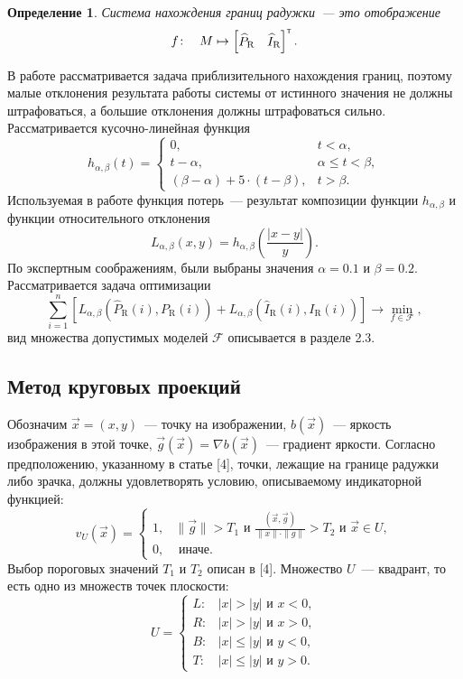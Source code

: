 \documentclass[12pt, twoside]{article}
\newtheorem{definition}{Определение}
\begin{document}
\begin{definition}
\emph{Система нахождения границ радужки}~--- это отображение
\[f\!: \quad M \mapsto \begin{bmatrix}\widehat{P}_\text{R} &  \widehat{I}_\text{R}\end{bmatrix}^{\text{\tiny\sffamily\upshape\mdseries T}}.\]
\end{definition}
В работе рассматривается задача приблизительного нахождения границ, поэтому малые отклонения результата работы системы от истинного значения не должны штрафоваться, а большие отклонения должны штрафоваться сильно. Рассматривается кусочно-линейная функция
\[
h_{\alpha, \beta}(t) = \begin{cases}0, &t < \alpha, \\ t - \alpha, &\alpha \leqslant t < \beta, \\ (\beta - \alpha) + 5\cdot (t - \beta), & t > \beta.\end{cases}
\]
Используемая в работе функция потерь~--- результат композиции функции $h_{\alpha, \beta}$ и функции относительного отклонения
\[
L_{\alpha, \beta} (x, y) = h_{\alpha, \beta}\left(\frac{|x-y|}{y}\right).
\]
По экспертным соображениям, были выбраны значения $\alpha = 0.1$ и $\beta = 0.2$. Рассматривается задача оптимизации
\begin{equation}\label{mainproblem}
\sum_{i=1}^n \left[ L_{\alpha, \beta} \left(\widehat{P}_\text{R}(i), P_\text{R}(i)\right) + L_{\alpha, \beta} \left(\widehat{I}_\text{R}(i), I_\text{R}(i)\right) \right]\to \min_{f\in \mathcal{F}},
\end{equation}
вид множества допустимых моделей $\mathcal{F}$ описывается в разделе 2.3.

\subsection{Метод круговых проекций}
Обозначим $\vec{x} = (x, y)$~--- точку на изображении, $b(\vec{x})$~--- яркость изображения в этой точке, $\vec{g}(\vec{x}) = \nabla b(\vec{x})$~--- градиент яркости. Согласно предположению, указанному в статье [4], точки, лежащие на границе радужки либо зрачка, должны удовлетворять условию, описываемому индикаторной функцией:
\[
v_U(\vec{x}) = \begin{cases}1, & \| \vec{g} \| > T_1 \text{ и } \frac{(\vec{x}, \vec{g})}{\| x \| \cdot \| g \|} > T_2 \text{ и } \vec{x} \in U, \\ 0, & \text{ иначе.}\end{cases}
\]
Выбор пороговых значений $T_1$ и $T_2$ описан в [4]. Множество $U$~--- квадрант, то есть одно из множеств точек плоскости:
\[
U = \begin{cases}L\!: & |x| > |y| \text{ и } x < 0, \\ R\!: & |x| > |y| \text{ и } x > 0, \\ B\!: & |x| \leqslant |y| \text{ и } y < 0, \\ T\!: & |x| \leqslant |y| \text{ и } y > 0.\end{cases}
\]
\end{document}
